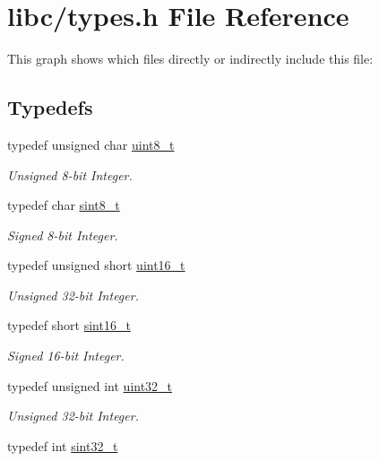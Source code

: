 \hypertarget{a00023}{}\section{libc/types.h File Reference}
\label{a00023}
This graph shows which files directly or indirectly include this file\+:
\subsection*{Typedefs}
\begin{DoxyCompactItemize}
\item 
typedef unsigned char \hyperlink{a00023_aba7bc1797add20fe3efdf37ced1182c5_aba7bc1797add20fe3efdf37ced1182c5}{uint8\+\_\+t}
\begin{DoxyCompactList}\small\item\em Unsigned 8-\/bit Integer. \end{DoxyCompactList}\item 
typedef char \hyperlink{a00023_afa23178c4119f09bd4562a86b501f444_afa23178c4119f09bd4562a86b501f444}{sint8\+\_\+t}
\begin{DoxyCompactList}\small\item\em Signed 8-\/bit Integer. \end{DoxyCompactList}\item 
typedef unsigned short \hyperlink{a00023_a273cf69d639a59973b6019625df33e30_a273cf69d639a59973b6019625df33e30}{uint16\+\_\+t}
\begin{DoxyCompactList}\small\item\em Unsigned 32-\/bit Integer. \end{DoxyCompactList}\item 
typedef short \hyperlink{a00023_a5881659ed80e940350d12831204375cd_a5881659ed80e940350d12831204375cd}{sint16\+\_\+t}
\begin{DoxyCompactList}\small\item\em Signed 16-\/bit Integer. \end{DoxyCompactList}\item 
typedef unsigned int \hyperlink{a00023_a435d1572bf3f880d55459d9805097f62_a435d1572bf3f880d55459d9805097f62}{uint32\+\_\+t}
\begin{DoxyCompactList}\small\item\em Unsigned 32-\/bit Integer. \end{DoxyCompactList}\item 
typedef int \hyperlink{a00023_ad838970452fe561cb8e0550cac5336be_ad838970452fe561cb8e0550cac5336be}{sint32\+\_\+t}

\end{DoxyCompactItemize}
